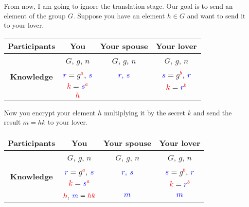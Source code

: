 From now, I am going to ignore the translation stage. Our goal is to send an element of the group $G$. Suppose you have an element $h\in G$ and want to send it to your lover.
\begin{center}
\begin{tabular}{|c|c|c|c|}
\hline
{\bf Participants}&{You}&{Your spouse}&{Your lover}\\
\hline
\multirow{4}{*}{\bf Knowledge}&{\textcolor{OliveGreen}{$G$}, \textcolor{OliveGreen}{$g$}, \textcolor{OliveGreen}{$n$}}&{\textcolor{OliveGreen}{$G$}, \textcolor{OliveGreen}{$g$}, \textcolor{OliveGreen}{$n$}}&{\textcolor{OliveGreen}{$G$}, \textcolor{OliveGreen}{$g$}, \textcolor{OliveGreen}{$n$}}\\
{}&{ \textcolor{blue}{$r$}$=$\textcolor{OliveGreen}{$ g$}\textcolor{red}{${}^a$}, \textcolor{blue}{$s$}}&{\textcolor{blue}{$r$, $s$}}&{ \textcolor{blue}{$s$}$=$\textcolor{OliveGreen}{$g$}\textcolor{red}{${}^b$}, \textcolor{blue}{$r$}}\\
{}&{ \textcolor{red}{$k$}$=$\textcolor{blue}{$s$}\textcolor{red}{${}^a$}}&{}&{ \textcolor{red}{$k$}$=$\textcolor{blue}{$r$}\textcolor{red}{${}^b$}}\\
{}&{\textcolor{red}{$h$}}&{}&{}\\
\hline
\end{tabular}
\end{center}

Now you encrypt your element $h$ multiplying it by the secret $k$ and send the result $m = hk$ to your lover.
\begin{center}
\begin{tabular}{|c|c|c|c|}
\hline
{\bf Participants}&{You}&{Your spouse}&{Your lover}\\
\hline
\multirow{4}{*}{\bf Knowledge}&{\textcolor{OliveGreen}{$G$}, \textcolor{OliveGreen}{$g$}, \textcolor{OliveGreen}{$n$}}&{\textcolor{OliveGreen}{$G$}, \textcolor{OliveGreen}{$g$}, \textcolor{OliveGreen}{$n$}}&{\textcolor{OliveGreen}{$G$}, \textcolor{OliveGreen}{$g$}, \textcolor{OliveGreen}{$n$}}\\
{}&{ \textcolor{blue}{$r$}$=$\textcolor{OliveGreen}{$ g$}\textcolor{red}{${}^a$}, \textcolor{blue}{$s$}}&{\textcolor{blue}{$r$, $s$}}&{ \textcolor{blue}{$s$}$=$\textcolor{OliveGreen}{$g$}\textcolor{red}{${}^b$}, \textcolor{blue}{$r$}}\\
{}&{ \textcolor{red}{$k$}$=$\textcolor{blue}{$s$}\textcolor{red}{${}^a$}}&{}&{ \textcolor{red}{$k$}$=$\textcolor{blue}{$r$}\textcolor{red}{${}^b$}}\\
{}&{\textcolor{red}{$h$}, $\textcolor{blue}{m} = \textcolor{red}{hk}$}&{\textcolor{blue}{$m$}}&{\textcolor{blue}{$m$}}\\
\hline
\end{tabular}
\end{center}

